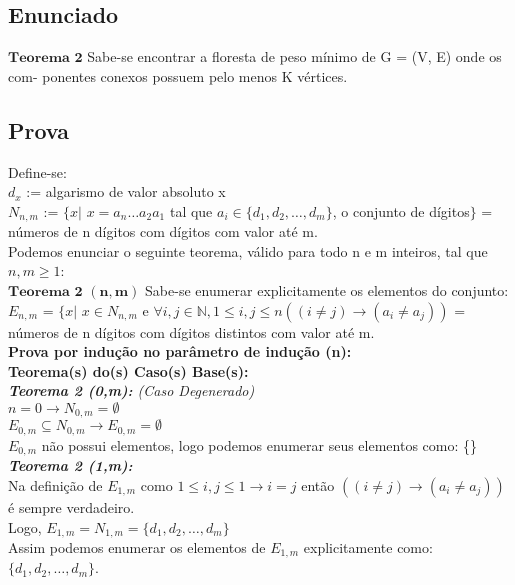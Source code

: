 \documentclass[twoside]{article}
\begin{document}
\begin{multicols}{2}
\subsection{ Enunciado }
\indent $\mathbf{Teorema}$ $\mathbf{2}$ Sabe-se encontrar a floresta de peso mínimo de G = (V, E) onde os com-
ponentes conexos possuem pelo menos K vértices.


\subsection{ Prova }
\indent 

Define-se:\\
$d_x$ := algarismo de valor absoluto x\\
$N_{n,m}$ := $\{ x | $ $x=a_n \dots a_2a_1$ tal que $a_i \in \{d_1,d_2, \dots ,d_m\}$, o conjunto de dígitos$\}$ = números de n dígitos com dígitos com valor até m.\\

Podemos enunciar o seguinte teorema, válido para todo n e m inteiros, tal que $n,m\geq1$:\\

$\mathbf{Teorema}$ $\mathbf{2}$ $\mathbf{(n,m)}$ Sabe-se enumerar explicitamente os elementos do conjunto:\\
$E_{n,m}$ = $\{ x | $ $x \in N_{n,m}$ e $\forall i,j \in \mathbb{N}, 1 \leq i,j \leq n ((i \neq j) \rightarrow ( a_i \neq a_j ))$ = números de n dígitos com dígitos distintos com valor até m.\\

\textbf{Prova por indução no parâmetro de indução (n):}\\
\textbf{Teorema(s) do(s) Caso(s) Base(s):}\\

\textit{\textbf{Teorema 2 (0,m):} (Caso Degenerado)}\\
$n=0 \rightarrow N_{0,m} = \emptyset$\\
$E_{0,m} \subseteq N_{0,m} \rightarrow E_{0,m} = \emptyset $\\
$E_{0,m}$ não possui elementos, logo podemos enumerar seus elementos como: \{\}\\

\textit{\textbf{Teorema 2 (1,m):}}\\
Na definição de $E_{1,m}$ como $1 \leq i,j \leq 1 \rightarrow i=j$ então $((i \neq j) \rightarrow ( a_i \neq a_j ))$ é sempre verdadeiro.\\
Logo,  $E_{1,m} = N_{1,m} = \{d_1,d_2,\dots,d_m\}$\\
Assim podemos enumerar os elementos de  $E_{1,m}$ explicitamente como: $\{d_1,d_2,\dots,d_m\}$.\\


\end{multicols}
\end{document}
